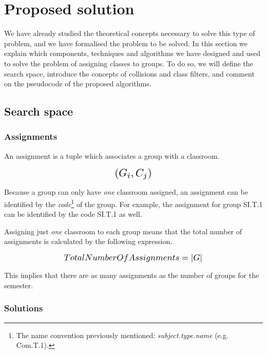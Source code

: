 \renewcommand{\documentname}{Proposed solution}

\chapter{Proposed solution}

We have already studied the theoretical concepts necessary to solve this type of problem, and we have formalised the problem to be solved. In this section we explain which components, techniques and algorithms we have designed and used to solve the problem of assigning classes to groups. To do so, we will define the search space, introduce the concepts of collisions and class filters, and comment on the pseudocode of the proposed algorithms.



\section{Search space}


\subsection{Assignments}

An assignment is a tuple which associates a group with a classroom.

\begin{equation}
    \scalebox{1.5}{$(G_{i}, C_{j})$}
\end{equation}

Because a group can only have \textit{one} classroom assigned, an assignment can be identified by the \textit{code}\footnote{The name convention previously mentioned: \textit{subject.type.name} (e.g. Com.T.1).} of the group. For example, the assignment for group SI.T.1 can be identified by the code SI.T.1 as well.

Assigning just \textit{one} classroom to each group means that the total number of assignments is calculated by the following expression.

\begin{equation}
    \scalebox{1.2}{$TotalNumberOfAssignments = \left|G\right|$}
\end{equation}

This implies that there are as many assignments as the number of groups for the semester.

\subsection{Solutions}

